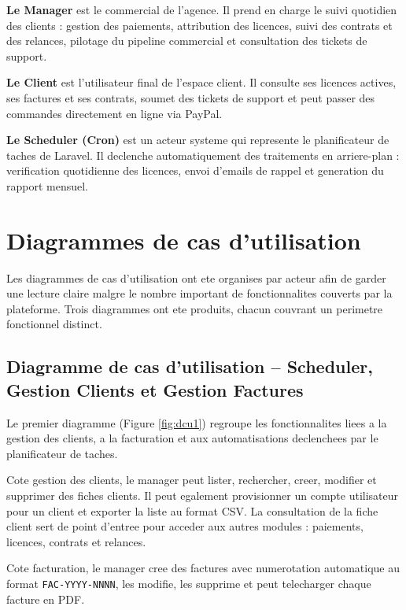\textbf{Le Manager} est le commercial de l'agence. Il prend en charge le
suivi quotidien des clients : gestion des paiements, attribution des
licences, suivi des contrats et des relances, pilotage du pipeline
commercial et consultation des tickets de support.

\textbf{Le Client} est l'utilisateur final de l'espace client. Il
consulte ses licences actives, ses factures et ses contrats, soumet des
tickets de support et peut passer des commandes directement en ligne via
PayPal.

\textbf{Le Scheduler (Cron)} est un acteur systeme qui represente le
planificateur de taches de Laravel. Il declenche automatiquement des
traitements en arriere-plan : verification quotidienne des licences,
envoi d'emails de rappel et generation du rapport mensuel.

\section{Diagrammes de cas d'utilisation}

Les diagrammes de cas d'utilisation ont ete organises par acteur afin
de garder une lecture claire malgre le nombre important de fonctionnalites
couverts par la plateforme. Trois diagrammes ont ete produits, chacun
couvrant un perimetre fonctionnel distinct.

\subsection{Diagramme de cas d'utilisation -- Scheduler, Gestion Clients
            et Gestion Factures}

Le premier diagramme (Figure \ref{fig:dcu1}) regroupe les fonctionnalites
liees a la gestion des clients, a la facturation et aux automatisations
declenchees par le planificateur de taches.

Cote gestion des clients, le manager peut lister, rechercher, creer,
modifier et supprimer des fiches clients. Il peut egalement provisionner
un compte utilisateur pour un client et exporter la liste au format CSV.
La consultation de la fiche client sert de point d'entree pour acceder
aux autres modules : paiements, licences, contrats et relances.

Cote facturation, le manager cree des factures avec numerotation
automatique au format \texttt{FAC-YYYY-NNNN}, les modifie, les supprime
et peut telecharger chaque facture en PDF.

